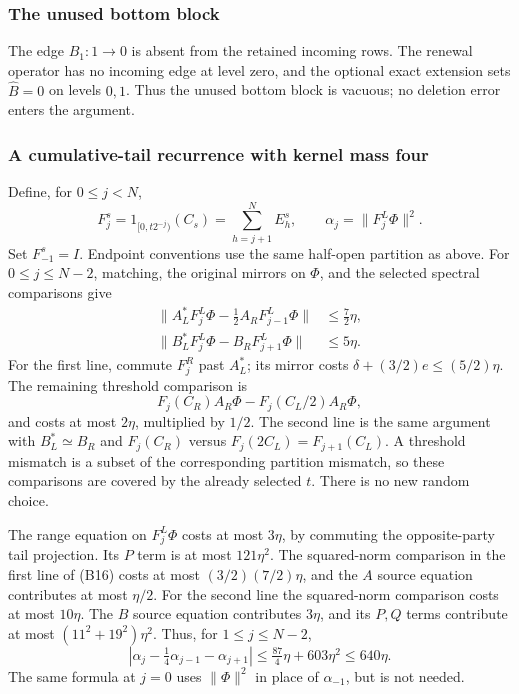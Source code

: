 \subsubsection{The unused bottom block}
The edge $B_1:1\to0$ is absent from the retained incoming rows. The renewal operator has no incoming edge at level zero, and the optional exact extension sets $\widehat B=0$ on levels $0,1$. Thus the unused bottom block is vacuous; no deletion error enters the argument.

\subsubsection{A cumulative-tail recurrence with kernel mass four}
Define, for $0\leq j<N$,
\[
 F_j^s=1_{[0,t2^{-j})}(C_s)=\sum_{h=j+1}^NE_h^s,
 \qquad \alpha_j=\|F_j^L\Phi\|^2.
\]
Set $F_{-1}^s=I$.  Endpoint conventions use the same half-open
partition as above.  For $0\leq j\leq N-2$, matching, the original
mirrors on $\Phi$, and the selected spectral comparisons give
\begin{align}
 \|A_L^*F_j^L\Phi-\tfrac12A_RF_{j-1}^L\Phi\|
   &\leq\tfrac72\eta,\\
 \|B_L^*F_j^L\Phi-B_RF_{j+1}^L\Phi\|
   &\leq5\eta.                                  \tag{B16}
\end{align}
For the first line, commute $F_j^R$ past $A_L^*$; its mirror costs
$\delta+(3/2)e\leq(5/2)\eta$.  The remaining threshold comparison is
\[
 F_j(C_R)A_R\Phi-F_j(C_L/2)A_R\Phi,
\]
and costs at most $2\eta$, multiplied by $1/2$.  The second line is
the same argument with $B_L^*\simeq B_R$ and
$F_j(C_R)$ versus $F_j(2C_L)=F_{j+1}(C_L)$.
A threshold mismatch is a subset of the corresponding partition
mismatch, so these comparisons are covered by the already selected
$t$.  There is no new random choice.

The range equation on $F_j^L\Phi$ costs at most $3\eta$, by commuting
the opposite-party tail projection.  Its $P$ term is at most
$121\eta^2$.  The squared-norm comparison in the first line of (B16)
costs at most $(3/2)(7/2)\eta$, and the $A$ source equation contributes
at most $\eta/2$.  For the second line the squared-norm comparison
costs at most $10\eta$.  The $B$ source equation contributes
$3\eta$, and its $P,Q$ terms contribute at most
$(11^2+19^2)\eta^2$.  Thus, for $1\leq j\leq N-2$,
\[
 |\alpha_j-\tfrac14\alpha_{j-1}-\alpha_{j+1}|
 \leq\tfrac{87}{4}\eta+603\eta^2\leq640\eta.    \tag{B17}
\]
The same formula at $j=0$ uses $\|\Phi\|^2$ in place of $\alpha_{-1}$,
but is not needed.

